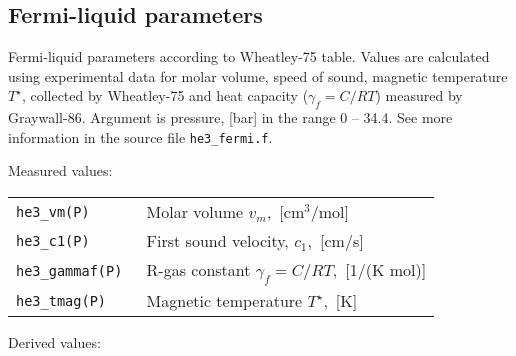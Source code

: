 \documentclass[a4paper]{article}
\begin{document}
\eject
\subsection*{Fermi-liquid parameters}

Fermi-liquid parameters according to {Wheatley-75} table. Values are
calculated using experimental data for molar volume, speed of sound,
magnetic temperature $T^\star$, collected by {Wheatley-75} and heat
capacity ($\gamma_f=C/RT$) measured by {Graywall-86}. Argument is
pressure, [bar] in the range 0 -- 34.4. See more information in the
source file {\tt he3\_fermi.f}.

\medskip
Measured values:

\medskip
\noindent\begin{tabular}{lp{12.5cm}}
\tt he3\_vm(P)     & Molar volume $v_m$,~[cm$^3$/mol]\\
\tt he3\_c1(P)     & First sound velocity, $c_1$,~[cm/s]\\
\tt he3\_gammaf(P) & R-gas constant $\gamma_f = C/RT$,~[1/(K mol)]\\
\tt he3\_tmag(P)   & Magnetic temperature $T^\star$,~[K]\newline\\
\end{tabular}

Derived values:
\end{document}
